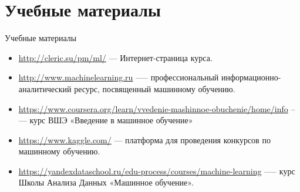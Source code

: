 \documentclass{beamer}
\begin{document}
\section{Учебные материалы}

\begin{frame}{Учебные материалы}
    \begin{itemize}
        \item \url{http://cleric.su/pm/ml/}  --- Интернет-страница курса.
        \item \url{http://www.machinelearning.ru} —-- профессиональный информационно-аналитический ресурс, посвященный машинному обучению.
        \item \url{https://www.coursera.org/learn/vvedenie-mashinnoe-obuchenie/home/info} --— курс ВШЭ «Введение в машинное обучение»
        \item \url{https://www.kaggle.com/} --- платформа для проведения конкурсов по машинному обучению.
        \item \url{https://yandexdataschool.ru/edu-process/courses/machine-learning} --— курс Школы Анализа Данных «Машинное обучение».
    \end{itemize}
\end{frame}
\end{document}
